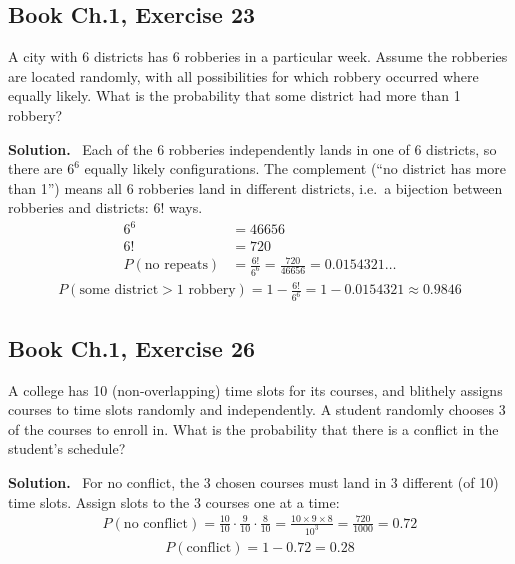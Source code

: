 \documentclass[11pt]{article}
\newcommand{\Sol}{\vspace{2pt}\noindent\textbf{Solution.}\ }
\begin{document}
\subsection{Book Ch.1, Exercise 23}
\begin{qbox}
A city with 6 districts has 6 robberies in a particular week. Assume the robberies are located randomly, with all possibilities for which robbery occurred where equally likely. What is the probability that some district had more than 1 robbery?
\end{qbox}
\Sol
Each of the 6 robberies independently lands in one of 6 districts, so there are $6^6$ equally likely configurations. The complement (``no district has more than 1'') means all 6 robberies land in different districts, i.e.\ a bijection between robberies and districts: $6!$ ways.
\begin{align*}
6^6 &= 46656\\
6! &= 720\\
P(\text{no repeats}) &= \frac{6!}{6^6} = \frac{720}{46656} = 0.0154321\ldots
\end{align*}
\begin{align*}
P(\text{some district}>1\text{ robbery}) = 1 - \frac{6!}{6^6} = 1-0.0154321 \approx 0.9846
\end{align*}

\subsection{Book Ch.1, Exercise 26}
\begin{qbox}
A college has 10 (non-overlapping) time slots for its courses, and blithely assigns courses to time slots randomly and independently. A student randomly chooses 3 of the courses to enroll in. What is the probability that there is a conflict in the student's schedule?
\end{qbox}
\Sol
For no conflict, the 3 chosen courses must land in 3 different (of 10) time slots. Assign slots to the 3 courses one at a time:
\begin{align*}
P(\text{no conflict}) = \frac{10}{10}\cdot\frac{9}{10}\cdot\frac{8}{10} = \frac{10\times 9\times 8}{10^3} = \frac{720}{1000} = 0.72
\end{align*}
\begin{align*}
P(\text{conflict}) = 1-0.72 = 0.28
\end{align*}
\end{document}
